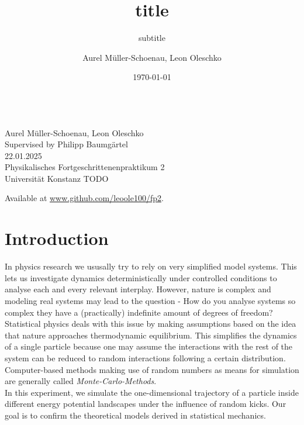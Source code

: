 \documentclass[
    parskip=half, 
    twoside=false,
    twocolumn=true,
    fontsize=11pt,
]{scrarticle}
\begin{document}
\title{title}
\subtitle{subtitle}
\author{Aurel Müller-Schoenau, Leon Oleschko}
\date{\dotdate\today}


\begin{titlepage}
    \sffamily
    \vspace*{3cm}
    {
        \fontsize{32}{32}
    }
    \vspace{.25cm}\\
    {
        \Large
        Aurel Müller-Schoenau, Leon Oleschko\\
        Supervised by Philipp Baumgärtel
        \vspace{.05cm}\\
        22.01.2025
        \vspace{.25cm}\\
        \normalsize
        Physikalisches Fortgeschrittenenpraktikum 2\\
        Universität Konstanz
    }
    \vfill
    {
        \normalfont\normalsize
        TODO
    }
    \vfill
    \begin{flushright}
        Available at \url{www.github.com/leoole100/fp2}.
    \end{flushright}
\end{titlepage}

\section{Introduction}
In physics research we ususally try to rely on very simplified model systems. This lets us investigate dynamics deterministically under controlled conditions to analyse each and every relevant interplay. However, nature is complex and modeling real systems may lead to the question - How do you analyse systems so complex they have a (practically) indefinite amount of degrees of freedom?\\
Statistical physics deals with this issue by making assumptions based on the idea that nature approaches thermodynamic equilibrium. This simplifies the dynamics of a single particle because one may assume the interactions with the rest of the system can be reduced to random interactions following a certain distribution. Computer-based methods making use of random numbers as means for simulation are generally called \textit{Monte-Carlo-Methods}.\\
In this experiment, we simulate the one-dimensional trajectory of a particle inside different energy potential landscapes under the influence of random kicks. Our goal is to confirm the theoretical models derived in statistical mechanics.
\end{document}

